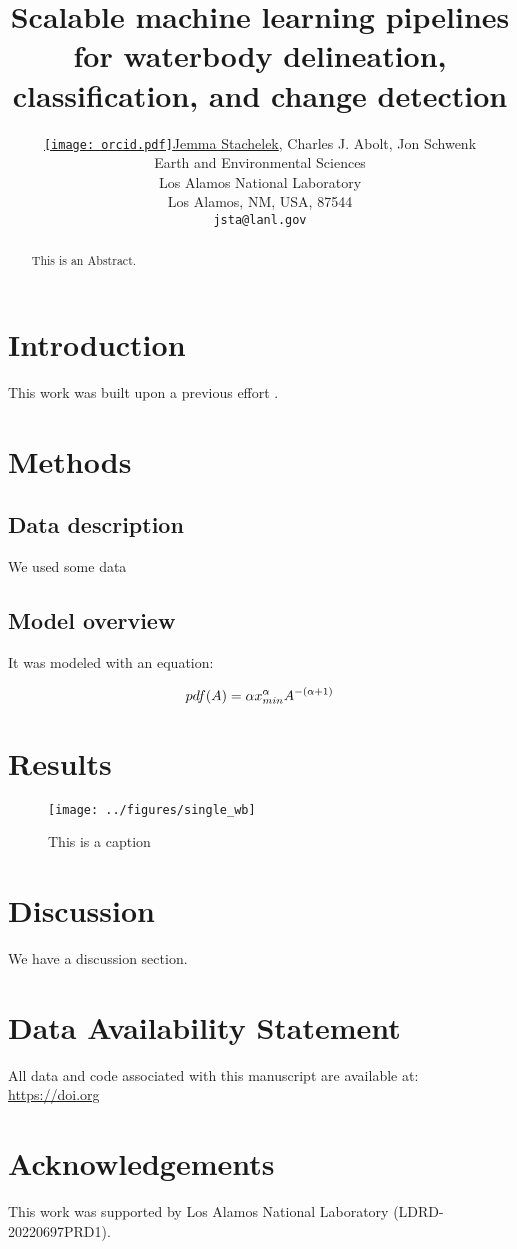 \documentclass{article}
\title{Scalable machine learning pipelines for waterbody delineation, classification, and change detection}
\date{} 					%
\author{ \href{https://orcid.org/0000-0002-5924-2464}{\texttt{[image: orcid.pdf]}\hspace{1mm}Jemma Stachelek}, Charles J. Abolt, Jon Schwenk \\
	Earth and Environmental Sciences\\
	Los Alamos National Laboratory\\
	Los Alamos, NM, USA, 87544 \\
	\texttt{jsta@lanl.gov} \\
}
\begin{document}
\maketitle

\begin{abstract}
	This is an Abstract.
\end{abstract}

\section{Introduction}
This work was built upon a previous effort \citep{stachelek_hydroml}.

\section{Methods}

\subsection{Data description}

We used some data

\subsection{Model overview}

It was modeled with an equation:

\begin{equation}
	pdf(A) = \alpha x_{min}^{\alpha}A^{-(\alpha+1)} \\
	\label{eqn:pareto_pdf}
\end{equation}

\section{Results}

\begin{figure}
	\centering
	\texttt{[image: ../figures/single\_wb]}
	\caption{This is a caption}
	\label{fig:single_wb}
\end{figure}

\section{Discussion}

We have a discussion section.

\section{Data Availability Statement}

All data and code associated with this manuscript are available at: \href{https://doi.org}{https://doi.org}

\section{Acknowledgements}

This work was supported by Los Alamos National Laboratory (LDRD-20220697PRD1).



\end{document}
